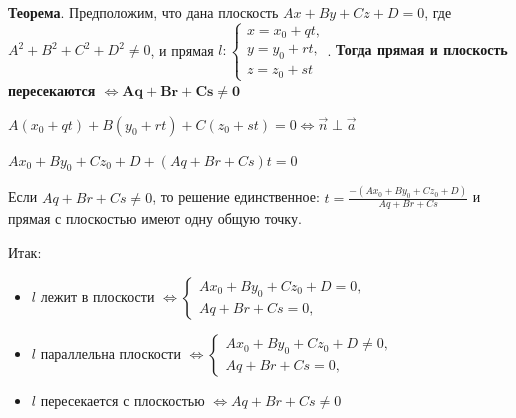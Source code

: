 \documentclass[a4paper]{article}
\begin{document}
    \begin{htheorem}
        \textbf{Теорема}. Предположим, что дана плоскость $Ax+By+Cz+D=0$, где $A^2+B^2+C^2+D^2\neq 0$, и прямая $\displaystyle l: \begin{cases}
                                                                                                                                      x=x_0+qt,
                                                                                                                                      \\
                                                                                                                                      y=y_0+rt,
                                                                                                                                      \\
                                                                                                                                      z=z_0+st
        \end{cases}$. \textbf{Тогда прямая и плоскость пересекаются $\mathbf{\Leftrightarrow Aq+Br+Cs \neq 0}$}
    \end{htheorem}

    \begin{hproof}
        $A(x_0 + qt) + B(y_0 + rt) + C(z_0 + st) = 0 \Leftrightarrow \vec{n} \perp \vec{a}$

        $Ax_0 + By_0 + Cz_0 + D + (Aq+Br+Cs)t=0$

        Если $Aq+Br+Cs \neq 0$, то решение единственное: $\displaystyle t = \frac{-(Ax_0 + By_0 + Cz_0 + D)}{Aq+Br+Cs}$ и прямая с плоскостью имеют одну общую точку.
    \end{hproof}

    Итак: \begin{itemize}
              \item $l$ лежит в плоскости $\Leftrightarrow \begin{cases}
                                                               Ax_0 + By_0 + Cz_0 + D = 0,
                                                               \\
                                                               Aq+Br+Cs=0,
              \end{cases}$
              \item $l$ параллельна плоскости $\Leftrightarrow \begin{cases}
                                                                   Ax_0 + By_0 + Cz_0 + D \neq 0,
                                                                   \\
                                                                   Aq+Br+Cs=0,
              \end{cases}$
              \item $l$ пересекается с плоскостью $\Leftrightarrow Aq+Br+Cs\neq 0$
    \end{itemize}
\end{document}
